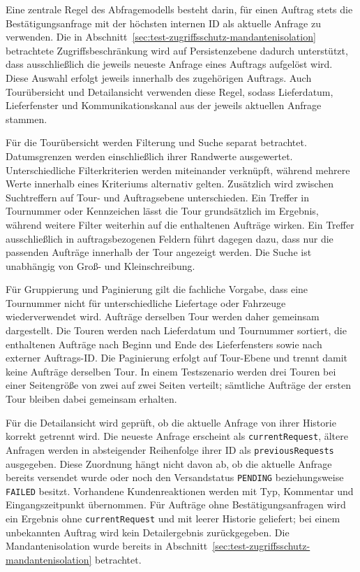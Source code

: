 Eine zentrale Regel des Abfragemodells besteht darin, für einen Auftrag stets
die Bestätigungsanfrage mit der höchsten internen ID als aktuelle Anfrage zu
verwenden. Die in
Abschnitt~\ref{sec:test-zugriffsschutz-mandantenisolation} betrachtete
Zugriffsbeschränkung wird auf Persistenzebene dadurch unterstützt, dass
ausschließlich die jeweils neueste Anfrage eines Auftrags aufgelöst wird. Diese
Auswahl erfolgt jeweils innerhalb des zugehörigen Auftrags. Auch Tourübersicht
und Detailansicht verwenden diese Regel, sodass Lieferdatum, Lieferfenster und
Kommunikationskanal aus der jeweils aktuellen Anfrage stammen.

Für die Tourübersicht werden Filterung und Suche separat betrachtet.
Datumsgrenzen werden einschließlich ihrer Randwerte ausgewertet.
Unterschiedliche Filterkriterien werden miteinander verknüpft, während mehrere
Werte innerhalb eines Kriteriums alternativ gelten. Zusätzlich wird zwischen
Suchtreffern auf Tour- und Auftragsebene unterschieden. Ein Treffer in
Tournummer oder Kennzeichen lässt die Tour grundsätzlich im Ergebnis, während
weitere Filter weiterhin auf die enthaltenen Aufträge wirken. Ein Treffer
ausschließlich in auftragsbezogenen Feldern führt dagegen dazu, dass nur die
passenden Aufträge innerhalb der Tour angezeigt werden. Die Suche ist
unabhängig von Groß- und Kleinschreibung.

Für Gruppierung und Paginierung gilt die fachliche Vorgabe, dass eine Tournummer
nicht für unterschiedliche Liefertage oder Fahrzeuge wiederverwendet wird.
Aufträge derselben Tour werden daher gemeinsam dargestellt. Die Touren werden
nach Lieferdatum und Tournummer sortiert, die enthaltenen Aufträge nach Beginn
und Ende des Lieferfensters sowie nach externer Auftrags-ID. Die Paginierung
erfolgt auf Tour-Ebene und trennt damit keine Aufträge derselben Tour. In einem
Testszenario werden drei Touren bei einer Seitengröße von zwei auf zwei Seiten
verteilt; sämtliche Aufträge der ersten Tour bleiben dabei gemeinsam erhalten.

Für die Detailansicht wird geprüft, ob die aktuelle Anfrage von ihrer Historie
korrekt getrennt wird. Die neueste Anfrage erscheint als
\texttt{currentRequest}, ältere Anfragen werden in absteigender Reihenfolge
ihrer ID als \texttt{previousRequests} ausgegeben. Diese Zuordnung hängt nicht
davon ab, ob die aktuelle Anfrage bereits versendet wurde oder noch den
Versandstatus \texttt{PENDING} beziehungsweise \texttt{FAILED} besitzt.
Vorhandene Kundenreaktionen werden mit Typ, Kommentar und Eingangszeitpunkt
übernommen. Für Aufträge ohne Bestätigungsanfragen wird ein Ergebnis ohne
\texttt{currentRequest} und mit leerer Historie geliefert; bei einem unbekannten
Auftrag wird kein Detailergebnis zurückgegeben. Die Mandantenisolation wurde
bereits in Abschnitt~\ref{sec:test-zugriffsschutz-mandantenisolation}
betrachtet.

